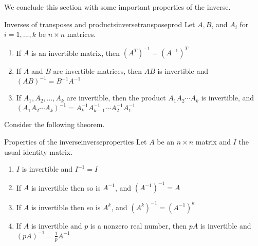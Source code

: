 We conclude this section with some important properties of the inverse. 

\begin{theorem}{Inverses of transposes and products}{inversetransposeprod}
Let $A, B$, and $A_i$ for $i=1,...,k$ be $n \times n$ matrices. 
\begin{enumerate}
\item
If $A$ is an invertible matrix, then $(A^{T})^{-1} = (A^{-1})^{T}$
\item
If $A$ and $B$ are invertible matrices, then $AB$ is invertible and $(AB)^{-1} = B^{-1}A^{-1}$
\item
If $A_1, A_2, ..., A_k$ are invertible, then the product $A_1A_2 \cdots A_k$ is invertible, and $(A_1A_2 \cdots A_k)^{-1} = A_k^{-1}A_{k-1}^{-1} \cdots A_2^{-1}A_1^{-1}$
\end{enumerate}
\end{theorem}

Consider the following theorem.

\begin{theorem}{Properties of the inverse}{inverseproperties}
Let $A$ be an $n \times n$ matrix and $I$ the usual identity matrix. 
\begin{enumerate}
\item
$I$ is invertible and $I^{-1} = I$
\item
If $A$ is invertible then so is $A^{-1}$, and $(A^{-1})^{-1} = A$
\item
If $A$ is invertible then so is $A^k$, and $(A^k)^{-1} = (A^{-1})^k$
\item
If $A$ is invertible and $p$ is a nonzero real number, then $pA$ is invertible and $(pA)^{-1} = \frac{1}{p}A^{-1}$
\end{enumerate}
\end{theorem}
